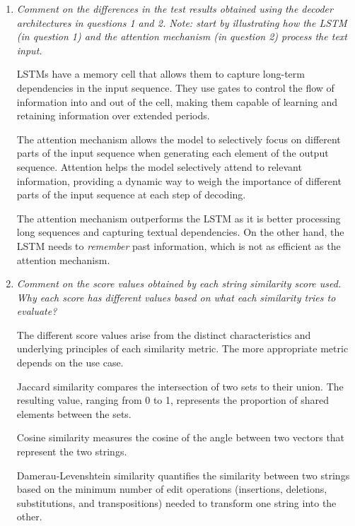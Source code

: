 \documentclass[12pt]{article}
\begin{document}
\begin{enumerate}[leftmargin=\labelsep]
    \item \textit{Comment on the differences in the test results obtained using the decoder architectures in questions 1 and 2. Note: start by illustrating how the LSTM (in question 1) and the attention mechanism (in question 2) process the text input.}

          \vspace{12pt}

          LSTMs have a memory cell that allows them to capture long-term dependencies in the input sequence. They use gates to control the flow of information into and out of the cell, making them capable of learning and retaining information over extended periods.

          The attention mechanism allows the model to selectively focus on different parts of the input sequence when generating each element of the output sequence. Attention helps the model selectively attend to relevant information, providing a dynamic way to weigh the importance of different parts of the input sequence at each step of decoding.

          The attention mechanism outperforms the LSTM as it is better processing long sequences and capturing textual dependencies. On the other hand, the LSTM needs to \textit{remember} past information, which is not as efficient as the attention mechanism.

    \item \textit{Comment on the score values obtained by each string similarity score used. Why each score has different values based on what each similarity tries to evaluate?}

          \vspace{12pt}

          The different score values arise from the distinct characteristics and underlying principles of each similarity metric. The more appropriate metric depends on the use case.

          \vspace{12pt}

          Jaccard similarity compares the intersection of two sets to their union. The resulting value, ranging from 0 to 1, represents the proportion of shared elements between the sets.

          \vspace{12pt}

          Cosine similarity measures the cosine of the angle between two vectors that represent the two strings.

          \vspace{12pt}

          Damerau-Levenshtein similarity quantifies the similarity between two strings based on the minimum number of edit operations (insertions, deletions, substitutions, and transpositions) needed to transform one string into the other.

\end{enumerate}
\end{document}
